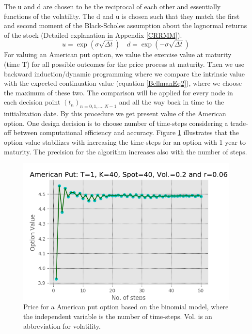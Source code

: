 The u and d are chosen to be the reciprocal of each other and essentially functions of the volatility. The d and u is chosen such that they match the first and second moment of the Black-Scholes assumption about the lognormal returns of the stock (Detailed explanation in Appendix \ref{CRRMM}).
$$u= \exp(\sigma \sqrt{\Delta t}) \quad d= \exp(-\sigma \sqrt{\Delta t})$$
For valuing an American put option, we value the exercise value at maturity (time T) for all possible outcomes for the price process at maturity. Then we use backward induction/dynamic programming where we compare the intrinsic value with the expected continuation value (equation \eqref{BellmanEq2}), where we choose the maximum of these two. The comparison will be applied for every node in each decision point $(t_{n})_{n=0,1,\ldots,N-1}$ and all the way back in time to the initialization date. By this procedure we get present value of the American option. One design decision is to choose number of time-steps considering a trade-off between computational efficiency and accuracy. Figure \ref{fig:binConv} illustrates that the option value stabilizes with increasing the time-steps for an option with 1 year to maturity. The precision for the algorithm increases also with the number of steps.\\

\begin{figure}[th]
\centering
\includegraphics{Figures/binConv.png}
\decoRule
\caption[Convergence Of Binomial Model]{Price for a American put option based on the binomial model, where the independent variable is the number of time-steps. Vol. is an abbreviation for volatility.}
\label{fig:binConv}
\end{figure}

